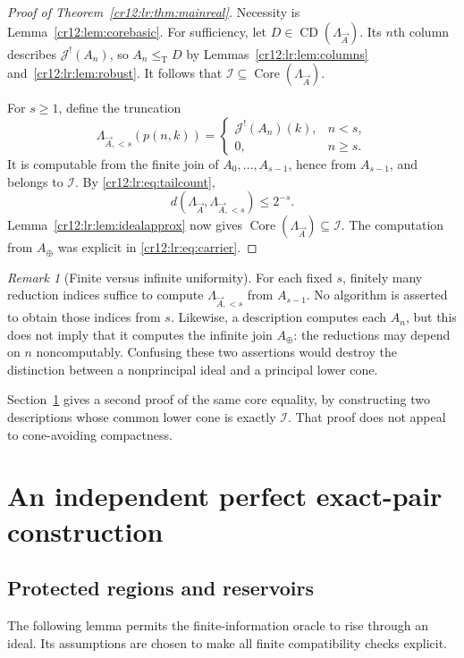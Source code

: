 \documentclass[11pt,letterpaper]{article}
\theoremstyle{plain}
\theoremstyle{definition}
\theoremstyle{remark}
\newtheorem{remark}[theorem]{Remark}
\numberwithin{equation}{section}
\newcommand{\leT}{\leq_{\mathrm T}}
\newcommand{\Core}{\operatorname{Core}}
\newcommand{\CD}{\operatorname{CD}}
\newcommand{\I}{\mathcal I}
\newcommand{\Aplus}{A_{\oplus}}          %
\newcommand{\Jfac}{\mathcal J^{!}}       %
\newcommand{\Lam}{\Lambda_{\vec A}}      %
\begin{document}
\begin{proof}[Proof of Theorem~\ref{cr12:lr:thm:mainreal}]
Necessity is Lemma~\ref{cr12:lem:corebasic}. For sufficiency, let $D\in\CD(\Lam)$. Its
$n$th column describes $\Jfac(A_n)$, so $A_n\leT D$ by
Lemmas~\ref{cr12:lr:lem:columns} and~\ref{cr12:lr:lem:robust}. It follows that
$\I\subseteq\Core(\Lam)$.

For $s\geq1$, define the truncation
\begin{equation}\label{cr12:lr:eq:truncation}
 \Lambda_{\vec A,<s}(p(n,k))=
 \begin{cases}
  \Jfac(A_n)(k),&n<s,\\
  0,&n\geq s.
 \end{cases}
\end{equation}
It is computable from the finite join of $A_0,\ldots,A_{s-1}$, hence from $A_{s-1}$,
and belongs to $\I$. By \eqref{cr12:lr:eq:tailcount},
\begin{equation}\label{cr12:lr:eq:truncationbound}
 d(\Lam,\Lambda_{\vec A,<s})\leq2^{-s}.
\end{equation}
Lemma~\ref{cr12:lr:lem:idealapprox} now gives $\Core(\Lam)\subseteq\I$. The
computation from $\Aplus$ was explicit in \eqref{cr12:lr:eq:carrier}.
\end{proof}

\begin{remark}[Finite versus infinite uniformity]\label{cr12:lr:rem:nonuniform}
For each fixed $s$, finitely many reduction indices suffice to compute $\Lambda_{\vec A,<s}$ from
$A_{s-1}$. No algorithm is asserted to obtain those indices from $s$. Likewise, a
description computes each $A_n$, but this does not imply that it computes the infinite
join $\Aplus$: the reductions may depend on $n$ noncomputably. Confusing these two
assertions would destroy the distinction between a nonprincipal ideal and a principal
lower cone.
\end{remark}

Section~\ref{cr12:lr:sec:fusion} gives a second proof of the same core equality, by
constructing two descriptions whose common lower cone is exactly $\I$. That proof does
not appeal to cone-avoiding compactness.

\section{An independent perfect exact-pair construction}\label{cr12:lr:sec:fusion}
\subsection{Protected regions and reservoirs}
The following lemma permits the finite-information oracle to rise through an ideal.
Its assumptions are chosen to make all finite compatibility checks explicit.
\end{document}
